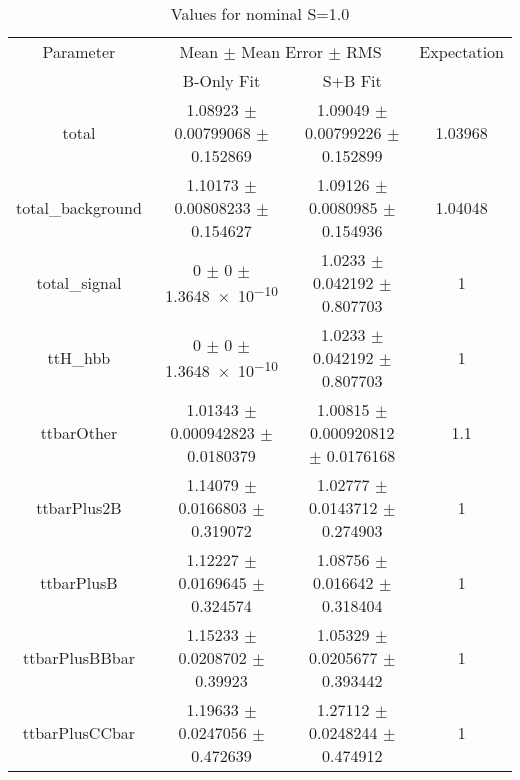 \begin{table}
\centering
\caption{Values for nominal S=1.0}
\begin{tabular}{cccc}
\toprule
Parameter & \multicolumn{2}{c}{Mean $\pm$ Mean Error $\pm$ RMS} & Expectation\\
 & B-Only Fit & S+B Fit & \\
\midrule
total & \num{1.08923} $\pm$ \num{0.00799068} $\pm$ \num{0.152869} & \num{1.09049} $\pm$ \num{0.00799226} $\pm$ \num{0.152899} & \num{1.03968}\\
total\_background & \num{1.10173} $\pm$ \num{0.00808233} $\pm$ \num{0.154627} & \num{1.09126} $\pm$ \num{0.0080985} $\pm$ \num{0.154936} & \num{1.04048}\\
total\_signal & \num{0} $\pm$ \num{0} $\pm$ \num{1.3648e-10} & \num{1.0233} $\pm$ \num{0.042192} $\pm$ \num{0.807703} & \num{1}\\
ttH\_hbb & \num{0} $\pm$ \num{0} $\pm$ \num{1.3648e-10} & \num{1.0233} $\pm$ \num{0.042192} $\pm$ \num{0.807703} & \num{1}\\
ttbarOther & \num{1.01343} $\pm$ \num{0.000942823} $\pm$ \num{0.0180379} & \num{1.00815} $\pm$ \num{0.000920812} $\pm$ \num{0.0176168} & \num{1.1}\\
ttbarPlus2B & \num{1.14079} $\pm$ \num{0.0166803} $\pm$ \num{0.319072} & \num{1.02777} $\pm$ \num{0.0143712} $\pm$ \num{0.274903} & \num{1}\\
ttbarPlusB & \num{1.12227} $\pm$ \num{0.0169645} $\pm$ \num{0.324574} & \num{1.08756} $\pm$ \num{0.016642} $\pm$ \num{0.318404} & \num{1}\\
ttbarPlusBBbar & \num{1.15233} $\pm$ \num{0.0208702} $\pm$ \num{0.39923} & \num{1.05329} $\pm$ \num{0.0205677} $\pm$ \num{0.393442} & \num{1}\\
ttbarPlusCCbar & \num{1.19633} $\pm$ \num{0.0247056} $\pm$ \num{0.472639} & \num{1.27112} $\pm$ \num{0.0248244} $\pm$ \num{0.474912} & \num{1}\\
\bottomrule
\end{tabular}
\end{table}